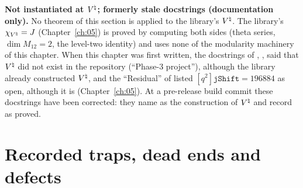 \begin{warning}
\textbf{Not instantiated at ${V^{\natural}}$; formerly stale docstrings (documentation only).} No theorem of this section is applied to the library's ${V^{\natural}}$.
The library's $\chi_{{V^{\natural}}} = J$ (Chapter~\ref{ch:05}) is proved by computing both sides (theta series, $\dim M_{12} = 2$, the
level-two identity) and uses none of the modularity machinery of this chapter. When this chapter was first written, the docstrings of
, ,  said that ${V^{\natural}}$ did
not exist in the repository (``Phase-3 project''), although the library already constructed ${V^{\natural}}$, and the
``Residual'' of  listed $[q^2]\mathtt{jShift} = 196884$ as open, although it is 
(Chapter~\ref{ch:05}). At a pre-release build commit these docstrings have been corrected: they name  as the
construction of ${V^{\natural}}$ and record  as proved.
\end{warning}

\section{Recorded traps, dead ends and defects}\label{l14:sec:traps}

